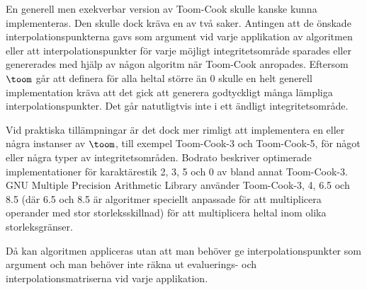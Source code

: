 En generell men exekverbar version av Toom-Cook skulle kanske kunna implementeras. Den skulle dock
kräva en av två saker. Antingen att de önskade interpolationspunkterna gavs som argument vid varje
applikation av algoritmen eller att interpolationspunkter för varje möjligt integritetsområde
sparades eller genererades med hjälp av någon algoritm när Toom-Cook anropades. Eftersom
$\toom$ går att definera för alla heltal större än 0 skulle en helt generell implementation
kräva att det gick att generera godtyckligt många lämpliga interpolationspunkter. Det går
natutligtvis inte i ett ändligt integritetsområde.

Vid praktiska tillämpningar är det dock mer rimligt att implementera en eller några
instanser av $\toom$, till exempel Toom-Cook-3 och Toom-Cook-5, för något eller några
typer av
integritetsområden. Bodrato\cite{bodrato2007a}\cite{bodrato2007towards}\cite{bodrato2007integer}
beskriver optimerade implementationer för karaktärestik 2, 3, 5 och 0 av bland
annat Toom-Cook-3. GNU
Multiple Precision
Arithmetic Library använder Toom-Cook-3, 4, 6.5 och 8.5
(där 6.5 och 8.5 är algoritmer speciellt anpassade för att multiplicera operander
med stor storleksskillnad) för att
multiplicera heltal inom olika storleksgränser.

Då kan algoritmen appliceras utan att man behöver ge interpolationspunkter som
argument och man behöver inte räkna ut evaluerings- och interpolationsmatriserna
vid varje applikation.
